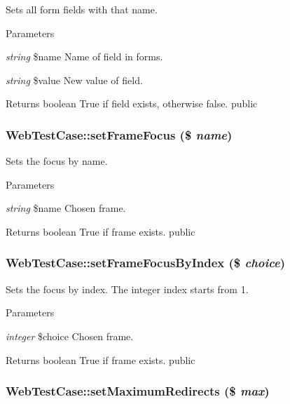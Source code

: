 \label{class_web_test_case_ab3d6b5e72b290f14f51148642f1681e4}
Sets all form fields with that name. 
\begin{DoxyParams}{Parameters}
\item[{\em string}]\$name Name of field in forms. \item[{\em string}]\$value New value of field. \end{DoxyParams}
\begin{DoxyReturn}{Returns}
boolean True if field exists, otherwise false.  public 
\end{DoxyReturn}
\hypertarget{class_web_test_case_a82a0b459aa100c3a67eec773c6e5b39d}{
\subsubsection[{setFrameFocus}]{\setlength{\rightskip}{0pt plus 5cm}WebTestCase::setFrameFocus (\$ {\em name})}}
\label{class_web_test_case_a82a0b459aa100c3a67eec773c6e5b39d}
Sets the focus by name. 
\begin{DoxyParams}{Parameters}
\item[{\em string}]\$name Chosen frame. \end{DoxyParams}
\begin{DoxyReturn}{Returns}
boolean True if frame exists.  public 
\end{DoxyReturn}
\hypertarget{class_web_test_case_afbcb7ba0d00c5df36698d2669d90cd9c}{
\subsubsection[{setFrameFocusByIndex}]{\setlength{\rightskip}{0pt plus 5cm}WebTestCase::setFrameFocusByIndex (\$ {\em choice})}}
\label{class_web_test_case_afbcb7ba0d00c5df36698d2669d90cd9c}
Sets the focus by index. The integer index starts from 1. 
\begin{DoxyParams}{Parameters}
\item[{\em integer}]\$choice Chosen frame. \end{DoxyParams}
\begin{DoxyReturn}{Returns}
boolean True if frame exists.  public 
\end{DoxyReturn}
\hypertarget{class_web_test_case_a1a94a628582b9cdb0610ee5772c0c5b9}{
\subsubsection[{setMaximumRedirects}]{\setlength{\rightskip}{0pt plus 5cm}WebTestCase::setMaximumRedirects (\$ {\em max})}}
